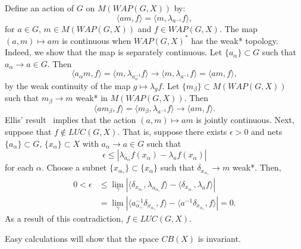 Define an action of $G$ on $M(WAP(G,X))$ by:
\[
\langle am, f\rangle = \langle m, \lambda_{a^{-1}} f\rangle,
\]
for $a\in G$, $m\in M(WAP(G,X))$ and $f\in WAP(G,X)$.  The map $(a,m) \mapsto am$ is continuous
when $WAP(G,X)^*$ has the weak* topology.  Indeed, we show that the map is separately continuous.
Let $\{a_\alpha\}\subset G$ such that $a_\alpha \rightarrow a \in G$.
Then
\[
\langle a_\alpha m,f\rangle = \langle m, \lambda_{a_\alpha^{-1}}f\rangle \rightarrow \langle m, \lambda_{a^{-1}} f\rangle
= \langle am, f\rangle,
\]
by the weak continuity of the map $g\mapsto \lambda_g f$.
Let $\{m_\beta\}\subset M(WAP(G,X))$ such that $m_\beta \rightarrow m$ weak* in $M(WAP(G,X))$.
Then
\[
\langle am_\beta, f\rangle = \langle m_\beta, \lambda_{a^{-1}} f \rangle \rightarrow \langle am,f\rangle.
\]
Ellis' result~\cite[Theorem 1]{ellis} implies that the action $(a,m)\mapsto am$ is jointly continuous.
Next, suppose that $f\not\in LUC(G,X)$.  That is, suppose there exists $\epsilon > 0$ and nets $\{a_\alpha\} \subset G$,
$\{x_\alpha\}\subset X$ with $a_\alpha \rightarrow a \in G$ such that
\[
\epsilon \leq |\lambda_{a_\alpha}f(x_\alpha) - \lambda_a f(x_\alpha)|
\]
for each $\alpha$.  Choose a subnet $\{x_{\alpha_\gamma}\}\subset \{x_\alpha\}$ such that
$\delta_{x_{\alpha_\gamma}} \rightarrow m$ weak*.  Then,
\begin{align*}
0<\epsilon &\leq \lim_\gamma |\langle\delta_{x_{\alpha_\gamma}}, \lambda_{a_{\alpha_\gamma}}f\rangle
- \langle\delta_{x_{\alpha_\gamma}}, \lambda_a f\rangle| \\
&=\lim_\gamma |\langle a_{\alpha_\gamma}^{-1} \delta_{x_{\alpha_\gamma}}, f\rangle
- \langle a^{-1}\delta_{x_{\alpha_\gamma}},f\rangle| = 0.
\end{align*}
As a result of this contradiction, $f\in LUC(G,X)$.
\done

\begin{remark}
Easy calculations will show that the space $CB(X)$ is invariant.
\end{remark}


